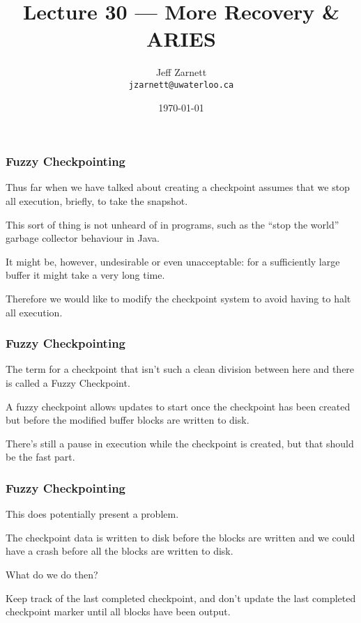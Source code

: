 

\title{Lecture 30 --- More Recovery \& ARIES }

\author{Jeff Zarnett \\ \small \texttt{jzarnett@uwaterloo.ca}}
\date{\today}




\begin{frame}
  \titlepage

 \end{frame}


\begin{frame}
\frametitle{Fuzzy Checkpointing}

Thus far when we have talked about creating a checkpoint assumes that we stop all execution, briefly, to take the snapshot. 

This sort of thing is not unheard of in programs, such as the ``stop the world'' garbage collector behaviour in Java. 

It might be, however, undesirable or even unacceptable: for a sufficiently large buffer it might take a very long time. 

Therefore we would like to modify the checkpoint system to avoid having to halt all execution.


\end{frame}

\begin{frame}
\frametitle{Fuzzy Checkpointing}

The term for a checkpoint that isn't such a clean division between here and there is called a \alert{Fuzzy Checkpoint}. 

A fuzzy checkpoint allows updates to start once the checkpoint has been created but before the modified buffer blocks are written to disk. 

There's still a pause in execution while the checkpoint is created, but that should be the fast part.


\end{frame}

\begin{frame}
\frametitle{Fuzzy Checkpointing}

This does potentially present a problem. 

The checkpoint data is written to disk before the blocks are written and we could have a crash before all the blocks are written to disk. 

What do we do then? 

Keep track of the last completed checkpoint, and don't update the last completed checkpoint marker until all blocks have been output.

\end{frame}

